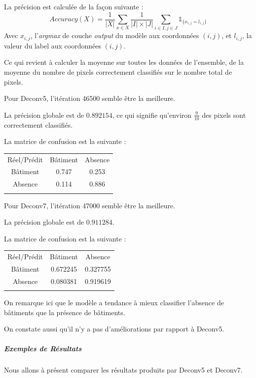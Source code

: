 \documentclass[a4paper, 11pt]{report}
\begin{document}
La précision est calculée de la façon suivante :
$$Accuracy(X) = \frac{1}{|X|}\sum_{x \in X} {\frac{1}{|I| \times |J|}\sum_{i \in I, j \in J} {\mathds{1}_{\{x_{i, j} = l_{i, j}\}}}}$$
Avec $x_{i, j}$, l'\emph{argmax} de couche \emph{output} du modèle aux coordonnées $(i, j)$, et $l_{i,j}$, la valeur du label aux coordonnées $(i, j)$.

Ce qui revient à calculer la moyenne sur toutes les données de l'ensemble, de la moyenne du nombre de pixels correctement classifiés sur le nombre total de pixels.

Pour Deconv5, l'itération 46500 semble être la meilleure.

La précision globale est de $0.892154$, ce qui signifie qu'environ $\frac{9}{10}$ des pixels sont correctement classifiés.

La matrice de confusion est la suivante :
\begin{center}
	\begin{tabularx}{0.5\textwidth}{c|c c|}
		Réel/Prédit & Bâtiment & Absence \\
		\hhline{---}
		Bâtiment & 0.747 \cellcolor[gray]{.8} & 0.253 \\
		Absence & 0.114 & 0.886 \cellcolor[gray]{.8}\\
		\hhline{~--}
	\end{tabularx}
\end{center}


Pour Deconv7, l'itération 47000 semble être la meilleure.

La précision globale est de $0.911284$.

La matrice de confusion est la suivante :
\begin{center}
	\begin{tabularx}{0.5\textwidth}{c|c c|}
		Réel/Prédit & Bâtiment & Absence \\
		\hhline{---}
		Bâtiment & 0.672245 \cellcolor[gray]{.8} & 0.327755 \\
		Absence & 0.080381 & 0.919619 \cellcolor[gray]{.8}\\
		\hhline{~--}
	\end{tabularx}
\end{center}

On remarque ici que le modèle a tendance à mieux classifier l'absence de bâtiments que la présence de bâtiments.

On constate aussi qu'il n'y a pas d'améliorations par rapport à Deconv5.

\subparagraph{Exemples de Résultats}
Nous allons à présent comparer les résultats produits par Deconv5 et Deconv7.
\end{document}
